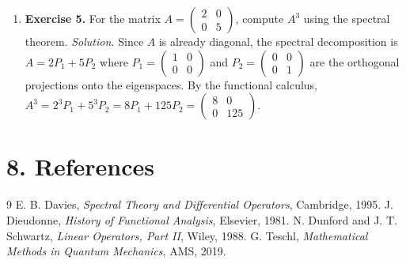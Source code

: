 \begin{enumerate}[leftmargin=*,itemsep=0.9em]
\item \textbf{Exercise 5.} For the matrix $A = \begin{pmatrix} 2 & 0 \\ 0 & 5 \end{pmatrix}$, compute $A^3$ using the spectral theorem. \emph{Solution.} Since $A$ is already diagonal, the spectral decomposition is $A = 2 P_1 + 5 P_2$ where $P_1 = \begin{pmatrix} 1 & 0 \\ 0 & 0 \end{pmatrix}$ and $P_2 = \begin{pmatrix} 0 & 0 \\ 0 & 1 \end{pmatrix}$ are the orthogonal projections onto the eigenspaces. By the functional calculus, $A^3 = 2^3 P_1 + 5^3 P_2 = 8 P_1 + 125 P_2 = \begin{pmatrix} 8 & 0 \\ 0 & 125 \end{pmatrix}$.

\end{enumerate}
\section*{8. References}
\begin{thebibliography}{9}
 E. B. Davies, \emph{Spectral Theory and Differential Operators}, Cambridge, 1995.
 J. Dieudonne, \emph{History of Functional Analysis}, Elsevier, 1981.
 N. Dunford and J. T. Schwartz, \emph{Linear Operators, Part II}, Wiley, 1988.
 G. Teschl, \emph{Mathematical Methods in Quantum Mechanics}, AMS, 2019.
\end{thebibliography}
